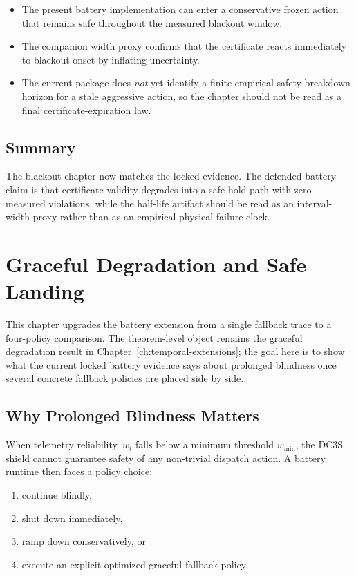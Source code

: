 \begin{itemize}
  \item The present battery implementation can enter a conservative frozen
    action that remains safe throughout the measured blackout window.
  \item The companion width proxy confirms that the certificate reacts
    immediately to blackout onset by inflating uncertainty.
  \item The current package does \emph{not} yet identify a finite empirical
    safety-breakdown horizon for a stale aggressive action, so the chapter
    should not be read as a final certificate-expiration law.
\end{itemize}

\subsection{Summary}

The blackout chapter now matches the locked evidence.  The defended battery
claim is that certificate validity degrades into a safe-hold path
with zero measured violations, while the half-life artifact should be read as
an interval-width proxy rather than as an empirical physical-failure clock.


\section{Graceful Degradation and Safe Landing}
\label{ch:graceful-degradation}

This chapter upgrades the battery extension from a single fallback trace to a
four-policy comparison.  The theorem-level object remains the graceful
degradation result in Chapter~\ref{ch:temporal-extensions}; the goal here is
to show what the current locked battery evidence says about prolonged
blindness once several concrete fallback policies are placed side by side.

\subsection{Why Prolonged Blindness Matters}

When telemetry reliability~$w_t$ falls below a minimum threshold
$w_{\min}$, the DC3S shield cannot guarantee safety of any non-trivial
dispatch action.  A battery runtime then faces a policy choice:

\begin{enumerate}
  \item continue blindly,
  \item shut down immediately,
  \item ramp down conservatively, or
  \item execute an explicit optimized graceful-fallback policy.
\end{enumerate}

